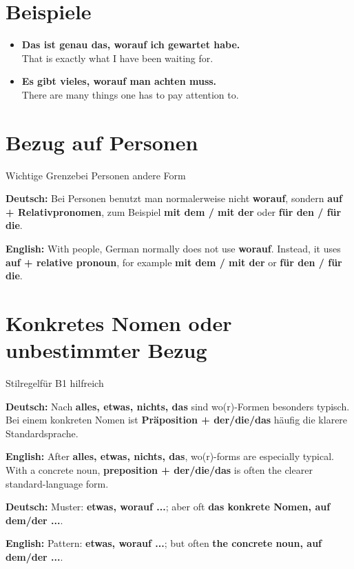 \documentclass[a4paper,11pt]{article}
\newcommand{\GermanText}[1]{\textbf{Deutsch: }#1\par}
\newcommand{\EnglishText}[1]{{\small\color{SoftGray}\textbf{English: }#1\par}}
\newcommand{\ExampleItem}[2]{\item \textbf{#1}\\{\small\color{SoftGray}#2}}
\begin{document}
\section{Beispiele}

\begin{exbox}

\begin{itemize}

\ExampleItem{Das ist genau das, worauf ich gewartet habe.}{That is exactly what I have been waiting for.}

\ExampleItem{Es gibt vieles, worauf man achten muss.}{There are many things one has to pay attention to.}

\end{itemize}

\end{exbox}

\section{Bezug auf Personen}

\begin{grammarentry}{Wichtige Grenze}{bei Personen andere Form}

\GermanText{Bei Personen benutzt man normalerweise nicht \textbf{worauf}, sondern \textbf{auf + Relativpronomen}, zum Beispiel \textbf{mit dem / mit der} oder \textbf{für den / für die}.}

\EnglishText{With people, German normally does not use \textbf{worauf}. Instead, it uses \textbf{auf + relative pronoun}, for example \textbf{mit dem / mit der} or \textbf{für den / für die}.}

\end{grammarentry}

\section{Konkretes Nomen oder unbestimmter Bezug}

\begin{grammarentry}{Stilregel}{für B1 hilfreich}

\GermanText{Nach \textbf{alles, etwas, nichts, das} sind wo(r)-Formen besonders typisch. Bei einem konkreten Nomen ist \textbf{Präposition + der/die/das} häufig die klarere Standardsprache.}

\EnglishText{After \textbf{alles, etwas, nichts, das}, wo(r)-forms are especially typical. With a concrete noun, \textbf{preposition + der/die/das} is often the clearer standard-language form.}

\GermanText{Muster: \textbf{etwas, worauf ...}; aber oft \textbf{das konkrete Nomen, auf dem/der ...}.}

\EnglishText{Pattern: \textbf{etwas, worauf ...}; but often \textbf{the concrete noun, auf dem/der ...}.}

\end{grammarentry}
\end{document}
